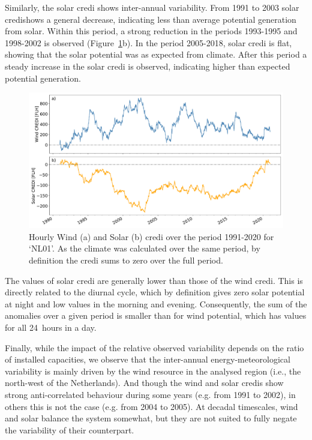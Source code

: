 \documentclass[12pt]{iopart}
\newcommand{\credi}[0]{{\sc credi}}
\newcommand{\sdi}[0]{{\sc solar credi}}
\newcommand{\wdi}[0]{{\sc wind credi}}
\begin{document}
Similarly, the \sdi{} shows inter-annual variability. 
From 1991 to 2003 \sdi shows a general decrease, indicating less than average potential generation from solar. 
Within this period, a strong reduction in the periods 1993-1995 and 1998-2002 is observed (Figure~\ref{fig:analysis_decadal}b). 
In the period 2005-2018, \sdi{} is flat, showing that the solar potential was as expected from climate. 
After this period a steady increase in the \sdi{} is observed, indicating higher than expected potential generation.

\begin{figure}[t]
        \centering
        \includegraphics[width=\textwidth]{Figures/CREDI_interannual.pdf}
        \caption{
                Hourly Wind (a) and Solar (b) \credi{} over the period 1991-2020 for `NL01'. 
                As the climate was calculated over the same period, by definition the \credi{} sums to zero over the full period.}
        \label{fig:analysis_decadal}
\end{figure}

The values of \sdi{} are generally lower than those of the \wdi{}. 
This is directly related to the diurnal cycle, which by definition gives zero solar potential at night and low values in the morning and evening. 
Consequently, the sum of the anomalies over a given period is smaller than for wind potential, which has values for all 24~hours in a day.

Finally, while the impact of the relative observed variability depends on the ratio of installed capacities, we observe that the inter-annual energy-meteorological variability is mainly driven by the wind resource in the analysed region (i.e., the north-west of the Netherlands). 
And though the {\sc wind} and {\sc solar} \credi s show strong anti-correlated behaviour during some years (e.g. from 1991 to 2002), in others this is not the case (e.g. from 2004 to 2005). 
At decadal timescales, wind and solar balance the system somewhat, but they are not suited to fully negate the variability of their counterpart.
\end{document}
